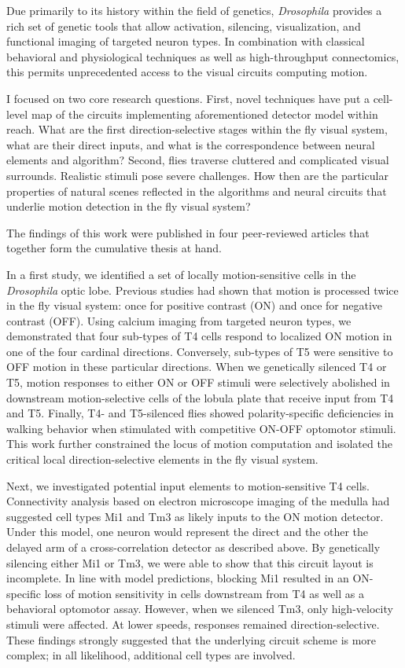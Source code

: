 Due primarily to its history within the field of genetics, \textit{Drosophila} provides a rich set of genetic tools that allow activation, silencing, visualization, and functional imaging of targeted neuron types. In combination with classical behavioral and physiological techniques as well as high-throughput connectomics, this permits unprecedented access to the visual circuits computing motion.

I focused on two core research questions. First, novel techniques have put a cell-level map of the circuits implementing aforementioned detector model within reach. What are the first direction-selective stages within the fly visual system, what are their direct inputs, and what is the correspondence between neural elements and algorithm? Second, flies traverse cluttered and complicated visual surrounds. Realistic stimuli pose severe challenges. How then are the particular properties of natural scenes reflected in the algorithms and neural circuits that underlie motion detection in the fly visual system?

The findings of this work were published in four peer-reviewed articles that together form the cumulative thesis at hand.

In a first study, we identified a set of locally motion-sensitive cells in the \textit{Drosophila} optic lobe. Previous studies had shown that motion is processed twice in the fly visual system: once for positive contrast (ON) and once for negative contrast (OFF). Using calcium imaging from targeted neuron types, we demonstrated that four sub-types of T4 cells respond to localized ON motion in one of the four cardinal directions. Conversely, sub-types of T5 were sensitive to OFF motion in these particular directions. When we genetically silenced T4 or T5, motion responses to either ON or OFF stimuli were selectively abolished in downstream motion-selective cells of the lobula plate that receive input from T4 and T5. Finally, T4- and T5-silenced flies showed polarity-specific deficiencies in walking behavior when stimulated with competitive ON-OFF optomotor stimuli. This work further constrained the locus of motion computation and isolated the critical local direction-selective elements in the fly visual system.

Next, we investigated potential input elements to motion-sensitive T4 cells. Connectivity analysis based on electron microscope imaging of the medulla had suggested cell types Mi1 and Tm3 as likely inputs to the ON motion detector. Under this model, one neuron would represent the direct and the other the delayed arm of a cross-correlation detector as described above. By genetically silencing either Mi1 or Tm3, we were able to show that this circuit layout is incomplete. In line with model predictions, blocking Mi1 resulted in an ON-specific loss of motion sensitivity in cells downstream from T4 as well as a behavioral optomotor assay. However, when we silenced Tm3, only high-velocity stimuli were affected. At lower speeds, responses remained direction-selective. These findings strongly suggested that the underlying circuit scheme is more complex; in all likelihood, additional cell types are involved.

